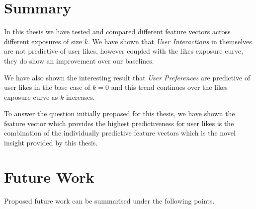 

\section{Summary}
\label{sec:summary}

In this thesis we have tested and compared different feature vectors across different exposures of size $k$. 
We have shown that \emph{User Interactions} in themselves are not predictive of user likes, however coupled with the 
likes exposure curve, they do show an improvement over our baselines.

We have also shown the interesting result that \emph{User Preferences} are predictive of user likes in the base case of $k = 0$ and 
this trend continues over the likes exposure curve as $k$ increases.

To answer the question initially proposed for this thesis, we have shown the feature vector which provides the highest predictiveness 
for user likes is the combination of the individually predictive feature vectors which is the novel insight provided by this thesis.

\section{Future Work}
\label{sec:fw}

Proposed future work can be summarised under the following points.

